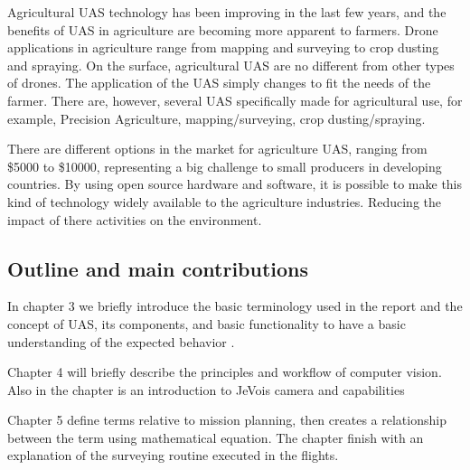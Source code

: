 
Agricultural UAS technology has been improving in the last few years, and the benefits of UAS in agriculture are becoming more apparent to farmers. Drone applications in agriculture range from mapping and surveying to crop dusting and spraying. On the surface, agricultural UAS are no different from other types of drones. The application of the UAS simply changes to fit the needs of the farmer. There are, however, several UAS specifically made for agricultural use, for example, Precision Agriculture, mapping/surveying, crop dusting/spraying. 

There are different options in the market for agriculture UAS, ranging from \$5000 to \$10000, representing a big challenge to small producers in developing countries. By using open source hardware and software, it is possible to make this kind of technology widely available to the agriculture industries. Reducing the impact of there activities on the environment.

\subsection{Outline and main contributions}
In chapter 3 we briefly introduce the basic terminology used in the report and the concept of UAS, its components, and basic functionality to have a basic understanding of the expected behavior .

Chapter 4 will briefly describe the principles and workflow of computer vision. Also in the chapter is an introduction to JeVois camera and capabilities

Chapter 5 define terms relative to mission planning, then creates a relationship between the term using mathematical equation.  The chapter finish with an explanation of the surveying routine executed in the flights.

